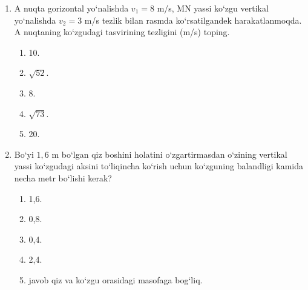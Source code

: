 \begin{enumerate}
\begin{enumerate}[label=\Alph*)]
\item 5.
\item $\sqrt{52}$.
\item 8.
\item $\sqrt{73}$.
\item 10.
\end{enumerate}

\item A nuqta gorizontal yo‘nalishda $v_1=8$ m/s, MN yassi ko‘zgu vertikal yo‘nalishda $v_2=3$ m/s tezlik bilan rasmda ko‘rsatilgandek harakatlanmoqda. A nuqtaning ko‘zgudagi tasvirining tezligini (m/s) toping.


\begin{enumerate}[label=\Alph*)]
\item 10.
\item $\sqrt{52}$.
\item 8.
\item $\sqrt{73}$.
\item 20.
\end{enumerate}

\item Bo‘yi $1,6$ m bo‘lgan qiz boshini holatini o‘zgartirmasdan o‘zining vertikal yassi ko‘zgudagi aksini to‘liqincha ko‘rish uchun ko‘zguning balandligi kamida necha metr bo‘lishi kerak?
\begin{enumerate}[label=\Alph*)]
\item 1,6.
\item 0,8.
\item 0,4.
\item 2,4.
\item javob qiz va ko‘zgu orasidagi masofaga bog‘liq.
\end{enumerate}


\end{enumerate}
